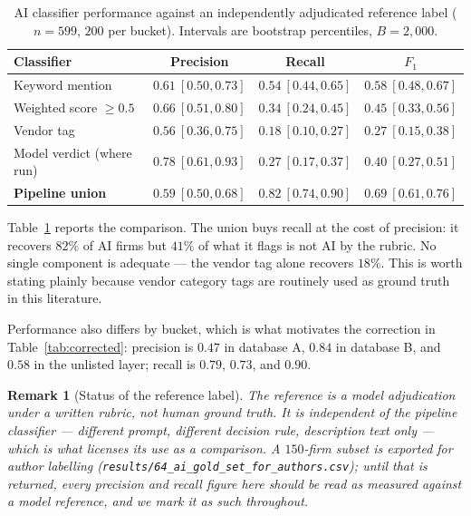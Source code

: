 \documentclass[11pt]{article}
\newtheorem{remark}{Remark}
\begin{document}
\begin{table}[htbp]
\centering\small
\caption{AI classifier performance against an independently adjudicated
reference label ($n=599$, $200$ per bucket). Intervals are bootstrap
percentiles, $B=2{,}000$.}
\label{tab:aieval}
\begin{tabular}{@{}lccc@{}}
\toprule
Classifier & Precision & Recall & $F_1$ \\
\midrule
Keyword mention          & $0.61\ [0.50, 0.73]$ & $0.54\ [0.44, 0.65]$ & $0.58\ [0.48, 0.67]$ \\
Weighted score $\ge 0.5$ & $0.66\ [0.51, 0.80]$ & $0.34\ [0.24, 0.45]$ & $0.45\ [0.33, 0.56]$ \\
Vendor tag               & $0.56\ [0.36, 0.75]$ & $0.18\ [0.10, 0.27]$ & $0.27\ [0.15, 0.38]$ \\
Model verdict (where run)& $0.78\ [0.61, 0.93]$ & $0.27\ [0.17, 0.37]$ & $0.40\ [0.27, 0.51]$ \\
\textbf{Pipeline union}  & $0.59\ [0.50, 0.68]$ & $\mathbf{0.82}\ [0.74, 0.90]$ & $\mathbf{0.69}\ [0.61, 0.76]$ \\
\bottomrule
\end{tabular}
\end{table}

Table~\ref{tab:aieval} reports the comparison. The union buys recall at the
cost of precision: it recovers $82\%$ of AI firms
but $41\%$ of what it flags is not AI by the rubric. No single component is
adequate --- the vendor tag alone recovers $18\%$. This is worth stating
plainly because vendor category tags are routinely used as ground truth in this
literature.

Performance also differs by bucket, which is what motivates the correction in
Table~\ref{tab:corrected}: precision is $0.47$ in database A, $0.84$ in
database B, and $0.58$ in the unlisted layer; recall is $0.79$, $0.73$, and
$0.90$.

\begin{remark}[Status of the reference label]
The reference is a model adjudication under a written rubric, not human ground
truth. It is independent of the pipeline classifier --- different prompt,
different decision rule, description text only --- which is what licenses its
use as a comparison. A $150$-firm subset is exported for author labelling
(\texttt{results/64\_ai\_gold\_set\_for\_authors.csv}); until that is returned,
every precision and recall figure here should be read as measured against a
model reference, and we mark it as such throughout.
\end{remark}
\end{document}

